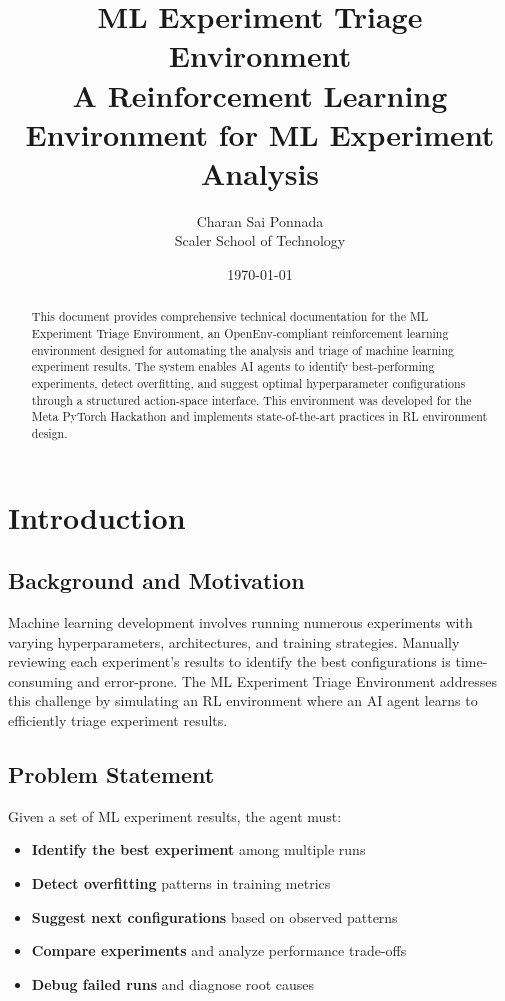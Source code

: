 \documentclass[12pt,a4paper]{article}
\title{\textbf{ML Experiment Triage Environment}\\\large A Reinforcement Learning Environment for ML Experiment Analysis}
\author{Charan Sai Ponnada\\Scaler School of Technology}
\date{\today}
\begin{document}
\maketitle

\begin{abstract}
	This document provides comprehensive technical documentation for the ML Experiment Triage Environment, an OpenEnv-compliant reinforcement learning environment designed for automating the analysis and triage of machine learning experiment results. The system enables AI agents to identify best-performing experiments, detect overfitting, and suggest optimal hyperparameter configurations through a structured action-space interface. This environment was developed for the Meta PyTorch Hackathon and implements state-of-the-art practices in RL environment design.
\end{abstract}

\newpage

\tableofcontents

\newpage

\section{Introduction}

\subsection{Background and Motivation}

Machine learning development involves running numerous experiments with varying hyperparameters, architectures, and training strategies. Manually reviewing each experiment's results to identify the best configurations is time-consuming and error-prone. The ML Experiment Triage Environment addresses this challenge by simulating an RL environment where an AI agent learns to efficiently triage experiment results.

\subsection{Problem Statement}

Given a set of ML experiment results, the agent must:
\begin{itemize}
	\item \textbf{Identify the best experiment} among multiple runs
	\item \textbf{Detect overfitting} patterns in training metrics
	\item \textbf{Suggest next configurations} based on observed patterns
	\item \textbf{Compare experiments} and analyze performance trade-offs
	\item \textbf{Debug failed runs} and diagnose root causes
\end{itemize}
\end{document}

